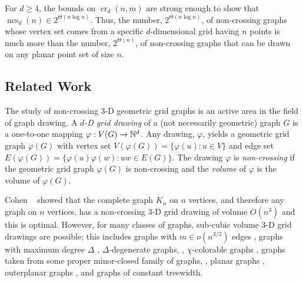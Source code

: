 \documentclass{patmorin}
\DeclareMathOperator{\crs}{cr}
\DeclareMathOperator{\ncs}{ncs}
\begin{document}
For $d\ge 4$, the bounds on $\crs_d(n,m)$ are strong enough to show that
$\ncs_d(n)\in 2^{\Theta(n\log n)}$.  Thus, the number, $2^{\Theta(n\log
n)}$, of non-crossing graphs whose vertex set comes from a specific
$d$-dimensional grid having $n$ points is much more than the number,
$2^{\Theta(n)}$,  of non-crossing graphs that can be drawn on any planar
point set of size $n$.

\subsection{Related Work}

The study of non-crossing 3-D geometric grid graphs is an
active area in the field of graph drawing.  A \emph{$d$-D
grid drawing} of a (not necessarily geometric) graph $G$ is a
one-to-one mapping $\varphi:V(G)\rightarrow \mathbb{N}^d$.  Any drawing,
$\varphi$, yields a geometric grid graph $\varphi(G)$ with
vertex set $V(\varphi(G))=\{\varphi(u):u\in V\}$ and edge set
$E(\varphi(G))=\{\varphi(u)\varphi(w):uw\in E(G)\}$.  The drawing
$\varphi$ is \emph{non-crossing} if the geometric grid graph $\varphi(G)$
is non-crossing and the \emph{volume} of $\varphi$ is the volume of
$\varphi(G)$.

Cohen \etal~\cite{cohen.eades.ea:three-dimensional} showed that the
complete graph $K_n$ on $n$ vertices, and therefore any graph on $n$
vertices, has a non-crossing 3-D grid drawing of volume $O(n^3)$ and this
is optimal.  However, for many classes of graphs, sub-cubic volume 3-D
grid drawings are possible; this includes 
graphs with $m\in o(n^{3/2})$ edges
  \cite{dujmovic.wood:three-dimensional}, 
graphs with maximum degree $\Delta$ 
  \cite{dujmovic.wood:three-dimensional,dujmovic.wood:upward},
$\Delta$-degenerate graphs,
  \cite{dujmovic.wood:three-dimensional}, 
$\chi$-colorable graphs
  \cite{pach.thiele.ea:three-dimensional}, 
graphs taken from some proper minor-closed family of graphs, 
  \cite{dujmovic.wood:three-dimensional}, 
planar graphs
  \cite{battista.frati.ea:on},
outerplanar graphs
  \cite{felsner.liotta.ea:straight-line},
and graphs of constant treewidth.  
\end{document}

